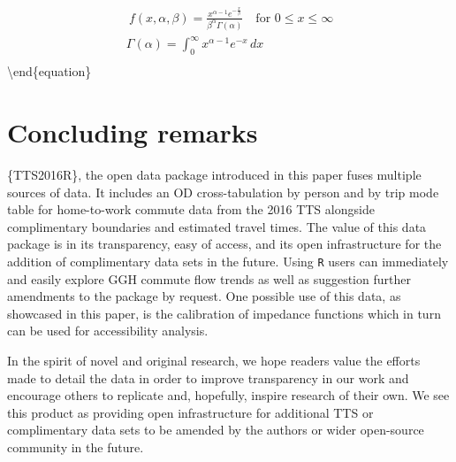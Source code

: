 \documentclass[Royal,times,sageh]{sagej}
\begin{document}
\begin{equation}
\label{gamma-dist}
\begin{array}{l}\ 
f(x, \alpha, \beta) = \frac {x^{\alpha-1}e^{-\frac{x}{\beta}}}{ \beta^{\alpha}\Gamma(\alpha)} \quad \text{for } 0 \leq x \leq \infty\\
\Gamma(\alpha) =  \int_{0}^{\infty} x^{\alpha-1}e^{-x} \,dx\\
\end{array}
\end{equation}\textbackslash end\{equation\}

\newpage

\hypertarget{concluding-remarks}{%
\section{Concluding remarks}\label{concluding-remarks}}

\{TTS2016R\}, the open data package introduced in this paper fuses
multiple sources of data. It includes an OD cross-tabulation by person
and by trip mode table for home-to-work commute data from the 2016 TTS
alongside complimentary boundaries and estimated travel times. The value
of this data package is in its transparency, easy of access, and its
open infrastructure for the addition of complimentary data sets in the
future. Using \texttt{R} users can immediately and easily explore GGH
commute flow trends as well as suggestion further amendments to the
package by request. One possible use of this data, as showcased in this
paper, is the calibration of impedance functions which in turn can be
used for accessibility analysis.

In the spirit of novel and original research, we hope readers value the
efforts made to detail the data in order to improve transparency in our
work and encourage others to replicate and, hopefully, inspire research
of their own. We see this product as providing open infrastructure for
additional TTS or complimentary data sets to be amended by the authors
or wider open-source community in the future.



\end{document}
